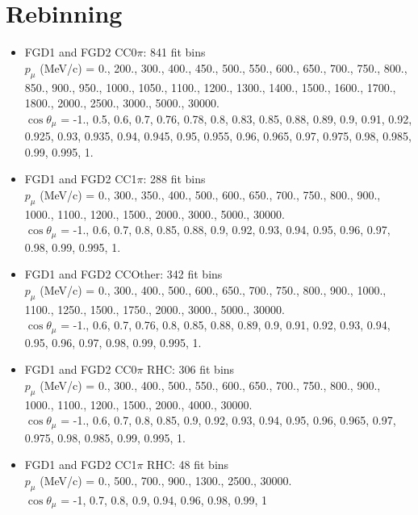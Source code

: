 \section{Rebinning}

\begin{itemize}
	\item FGD1 and FGD2 CC0$\pi$: 841 fit bins\\
	$p_\mu$ (MeV/c) = 0., 200., 300., 400., 450., 500., 550., 600., 650., 700., 750., 800., 850., 900., 950., 1000., 1050., 1100., 1200., 1300., 1400., 1500., 1600., 1700., 1800., 2000., 2500., 3000., 5000., 30000.\\
	$\cos\theta_\mu$ = -1., 0.5, 0.6, 0.7, 0.76, 0.78, 0.8, 0.83, 0.85, 0.88, 0.89, 0.9, 0.91, 0.92, 0.925, 0.93, 0.935, 0.94, 0.945, 0.95, 0.955, 0.96, 0.965, 0.97, 0.975, 0.98, 0.985, 0.99, 0.995, 1.
	
	\item FGD1 and FGD2 CC1$\pi$: 288 fit bins\\
	$p_\mu$ (MeV/c) = 0., 300., 350., 400., 500., 600., 650., 700., 750., 800., 900., 1000., 1100., 1200., 1500., 2000., 3000., 5000., 30000.\\
	$\cos\theta_\mu$ = -1., 0.6, 0.7, 0.8, 0.85, 0.88, 0.9, 0.92, 0.93, 0.94, 0.95, 0.96, 0.97, 0.98, 0.99, 0.995, 1.
	
	\item FGD1 and FGD2 CCOther: 342 fit bins\\
	$p_\mu$ (MeV/c) = 0., 300., 400., 500., 600., 650., 700., 750., 800., 900., 1000., 1100., 1250., 1500., 1750., 2000., 3000., 5000., 30000.\\
	$\cos\theta_\mu$ = -1., 0.6, 0.7, 0.76, 0.8, 0.85, 0.88, 0.89, 0.9, 0.91, 0.92, 0.93, 0.94, 0.95, 0.96, 0.97, 0.98, 0.99, 0.995, 1.
	
	\item FGD1 and FGD2 CC0$\pi$ RHC: 306 fit bins\\
	$p_\mu$ (MeV/c) = 0., 300., 400., 500., 550., 600., 650., 700., 750., 800., 900., 1000., 1100., 1200., 1500., 2000., 4000., 30000.\\
	$\cos\theta_\mu$ = -1., 0.6, 0.7, 0.8, 0.85, 0.9, 0.92, 0.93, 0.94, 0.95, 0.96, 0.965, 0.97, 0.975, 0.98, 0.985, 0.99, 0.995, 1.
	
	\item FGD1 and FGD2 CC1$\pi$ RHC: 48 fit bins \\
	$p_\mu$ (MeV/c) = 0., 500., 700., 900., 1300., 2500., 30000.\\
	$\cos\theta_\mu$ = -1, 0.7, 0.8, 0.9, 0.94, 0.96, 0.98, 0.99, 1
	

\end{itemize}
